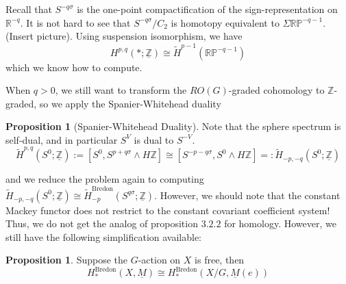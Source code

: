 \documentclass{article}
\theoremstyle{definition}
\newtheorem{proposition}[theorem]{Proposition}
\begin{document}
Recall that $S^{-q\sigma}$ is the one-point compactification of the sign-representation on $\mathbb{R}^{-q}$. It is not hard to see that $S^{-q\sigma}/C_2$ is homotopy equivalent to $\Sigma \mathbb{RP}^{-q-1}$. (Insert picture). Using suspension isomorphism, we have 
\[H^{p,q}(*;\underline{\mathbb{Z}})\cong \tilde{H}^{p-1}(\mathbb{RP}^{-q-1})\]
which we know how to compute. 

When $q>0$, we still want to transform the $RO(G)$-graded cohomology to $\mathbb{Z}$-graded, so we apply the Spanier-Whitehead duality 


\begin{tcolorbox}[colback=blue!5!white,colframe=blue!30!white]
\begin{proposition}[Spanier-Whitehead Duality]
Note that the sphere spectrum is self-dual, and in particular $S^{V}$ is dual to $S^{-V}$. 
    \[\tilde{H}^{p,q}(S^0;\underline{\mathbb{Z}}):=[S^0,S^{p+q\sigma}\wedge H \mathbb{Z}]\cong [S^{-p-q\sigma}, S^0\wedge H \mathbb{Z}]=: \tilde{H}_{-p,-q}(S^0;\underline{\mathbb{Z}})\]
\end{proposition}
\end{tcolorbox}
and we reduce the problem again to computing $\tilde{H}_{-p,-q}(S^0;\underline{\mathbb{Z}})\cong \tilde{H}^{\textrm{Bredon}}_{-p}(S^{q\sigma};\underline{\mathbb{Z}})$. However, we should note that the constant Mackey functor does not restrict to the constant covariant coefficient system! Thus, we do not get the analog of proposition $3.2.2$ for homology. However, we still have the following simplification available: 


\begin{tcolorbox}[colback=blue!5!white,colframe=blue!30!white]
\begin{proposition}
Suppose the $G$-action on $X$ is free, then 
\[H^{\textrm{Bredon}}_{*}(X, \underline{M})\cong H^{\textrm{Bredon}}_{*}(X/G, \underline{M}(e))\]
\end{proposition}
\end{tcolorbox}
 
\end{document}
